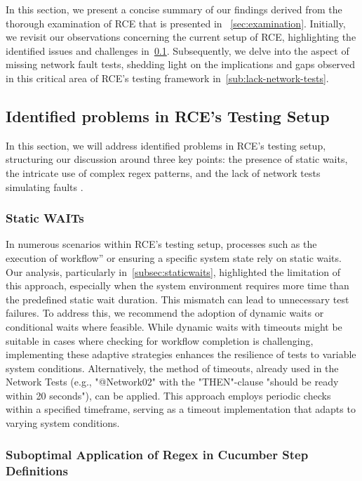 In this section, we present a concise summary of our findings derived from the thorough examination of \ac{RCE} that is presented in ~\cref{sec:examination}. Initially, we revisit our observations concerning the current setup of RCE, highlighting the identified issues and challenges in~\cref{sub:identified-problems}. Subsequently, we delve into the aspect of missing network fault tests, shedding light on the implications and gaps observed in this critical area of RCE's testing framework in~\cref{sub:lack-network-tests}. 

\subsection{Identified problems in RCE's Testing Setup}
\label{sub:identified-problems}
In this section, we will address identified problems in RCE's testing setup, structuring our discussion around three key points: the presence of static waits, the intricate use of complex regex patterns, and the lack of network tests simulating faults
.
\subsubsection{Static WAITs}
In numerous scenarios within \ac{RCE}'s testing setup, processes such as the execution of workflow” or ensuring a specific system state rely on static waits. Our analysis, particularly in~\cref{subsec:staticwaits}, highlighted the limitation of this approach, especially when the system environment requires more time than the predefined static wait duration. This mismatch can lead to unnecessary test failures. To address this, we recommend the adoption of dynamic waits or conditional waits where feasible. While dynamic waits with timeouts might be suitable in cases where checking for workflow completion is challenging, implementing these adaptive strategies enhances the resilience of tests to variable system conditions. Alternatively, the method of timeouts, already used in the Network Tests (e.g., "@Network02" with the "THEN"-clause "should be ready within 20 seconds"), can be applied. This approach employs periodic checks within a specified timeframe, serving as a timeout implementation that adapts to varying system conditions.


\subsubsection{Suboptimal Application of Regex in Cucumber Step Definitions}
\label{subsec:resultCucumber}


